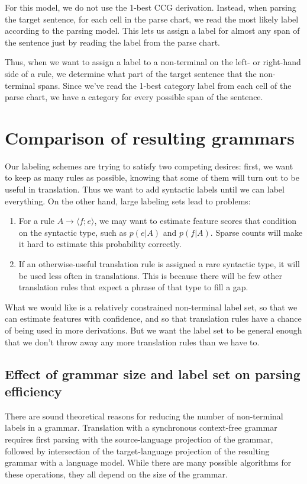 \documentclass[a4paper]{article}
\begin{document}
For this model, we do not use the 1-best CCG derivation. Instead, when parsing the target sentence, for each cell in the parse chart, we read the most likely label according to the parsing model. This lets us assign a label for almost any span of the sentence just by reading the label from the parse chart.

Thus, when we want to assign a label to a non-terminal on the left- or right-hand side of a rule, we determine what part of the target sentence that the non-terminal spans. Since we've read the 1-best category label from each cell of the parse chart, we have a category for every possible span of the sentence.

\section{Comparison of resulting grammars}
\label{sec:comparison}

Our labeling schemes are trying to satisfy two competing desires: first, we want to keep as many rules as possible, knowing that some of them will turn out to be useful in translation. Thus we want to add syntactic labels until we can label everything. On the other hand, large labeling sets lead to problems:
\begin{enumerate}
\item For a rule $A \to \langle f ; e \rangle$, we may want to estimate feature scores that condition on the syntactic type, such as $p(e|A)$ and $p(f|A)$. Sparse counts will make it hard to estimate this probability correctly.
\item If an otherwise-useful translation rule is assigned a rare syntactic type, it will be used less often in translations. This is because there will be few other translation rules that expect a phrase of that type to fill a gap.
\end{enumerate}
What we would like is a relatively constrained non-terminal label set, so that we can estimate features with confidence, and so that translation rules have a chance of being used in more derivations. But we want the label set to be general enough that we don't throw away any more translation rules than we have to.


\subsection{Effect of grammar size and label set on parsing efficiency}

There are sound theoretical reasons for reducing the number of non-terminal labels in a grammar. Translation with a synchronous context-free grammar requires first parsing with the source-language projection of the grammar, followed by intersection of the target-language projection of the resulting grammar with a language model. While there are many possible algorithms for these operations, they all depend on the size of the grammar.
\end{document}
